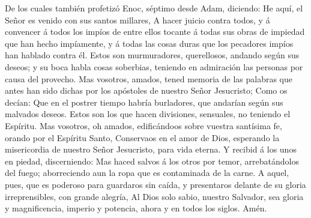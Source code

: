 De los cuales también profetizó Enoc, séptimo desde Adam, diciendo: He
aquí, el Señor es venido con sus santos millares,  A hacer
juicio contra todos, y á convencer á todos los impíos de entre ellos
tocante á todas sus obras de impiedad que han hecho impíamente, y á
todas las cosas duras que los pecadores impíos han hablado contra él.
 Estos son murmuradores, querellosos, andando según sus
deseos; y su boca habla cosas soberbias, teniendo en admiración las
personas por causa del provecho.  Mas vosotros, amados,
tened memoria de las palabras que antes han sido dichas por los
apóstoles de nuestro Señor Jesucristo;  Como os decían: Que
en el postrer tiempo habría burladores, que andarían según sus malvados
deseos.  Estos son los que hacen divisiones, sensuales, no
teniendo el Espíritu.  Mas vosotros, oh amados,
edificándoos sobre vuestra santísima fe, orando por el Espíritu Santo,
 Conservaos en el amor de Dios, esperando la misericordia
de nuestro Señor Jesucristo, para vida eterna.  Y recibid á
los unos en piedad, discerniendo:  Mas haced salvos á los
otros por temor, arrebatándolos del fuego; aborreciendo aun la ropa que
es contaminada de la carne.  A aquel, pues, que es poderoso
para guardaros sin caída, y presentaros delante de su gloria
irreprensibles, con grande alegría,  Al Dios solo sabio,
nuestro Salvador, sea gloria y magnificencia, imperio y potencia, ahora
y en todos los siglos. Amén.
